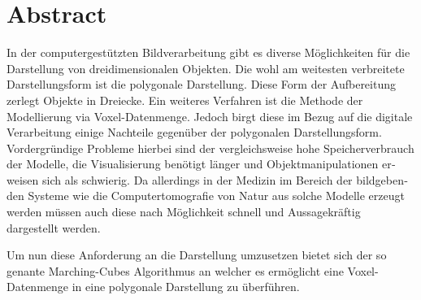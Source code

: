\chapter{Abstract}

\begin{english} %
In der computergestützten Bildverarbeitung gibt es diverse Möglichkeiten für die Darstellung von dreidimensionalen Objekten. Die wohl am weitesten
verbreitete Darstellungsform ist die polygonale Darstellung. Diese Form der Aufbereitung zerlegt Objekte in Dreiecke. Ein weiteres Verfahren ist die Methode der Modellierung via Voxel-Datenmenge. Jedoch birgt diese im Bezug auf die digitale Verarbeitung einige Nachteile gegenüber der polygonalen Darstellungsform. Vordergründige Probleme hierbei sind der vergleichsweise hohe Speicherverbrauch der Modelle, die Visualisierung benötigt länger und Objektmanipulationen erweisen sich als schwierig. Da allerdings in der Medizin im Bereich der bildgebenden Systeme wie die Computertomografie von Natur aus solche Modelle erzeugt werden müssen auch diese nach Möglichkeit schnell und Aussagekräftig dargestellt werden.

Um nun diese Anforderung an die Darstellung umzusetzen bietet sich der so genante Marching-Cubes Algorithmus an welcher es ermöglicht eine Voxel-Datenmenge in eine polygonale Darstellung zu überführen. 
\end{english}
